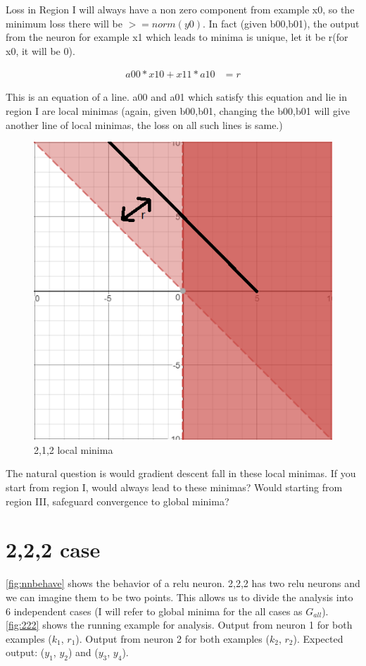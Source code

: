 \documentclass[conference]{IEEEtran}
\begin{document}
Loss in Region I will always have a non zero component from example x0, so the minimum loss there will be $>= norm(y0)$.
In fact (given b00,b01), the output from the neuron for example x1 which leads to minima is unique, let it be r(for x0, it will be 0). 

\begin{align}
a00*x10 + x11*a10 &= r
\end{align} 

This is an equation of a line. a00 and a01 which satisfy this equation and lie in region I are local minimas (again, given b00,b01, changing the b00,b01 will give another line of local minimas, the loss on all such lines is same.)

\begin{figure}
	\includegraphics[width=\linewidth]{images/nn/212r.png}
	\caption{2,1,2 local minima}
	\label{fig:212localminima}
\end{figure}

The natural question is would gradient descent fall in these local minimas. If you start from region I, would always lead to these minimas? Would starting from region III, safeguard convergence to global minima?

\section{2,2,2 case}
\ref{fig:nnbehave} shows the behavior of a relu neuron. 2,2,2 has two relu neurons and we can imagine them to be two points. This allows us to divide the analysis into 6 independent cases (I will refer to global minima for the all cases as $G_{all}$). \ref{fig:222} shows the running example for analysis. Output from neuron 1 for both examples ($k_1$, $r_1$). Output from neuron 2 for both examples ($k_2$, $r_2$). Expected output: ($y_1$, $y_2$) and ($y_3$, $y_4$).  
\end{document}

